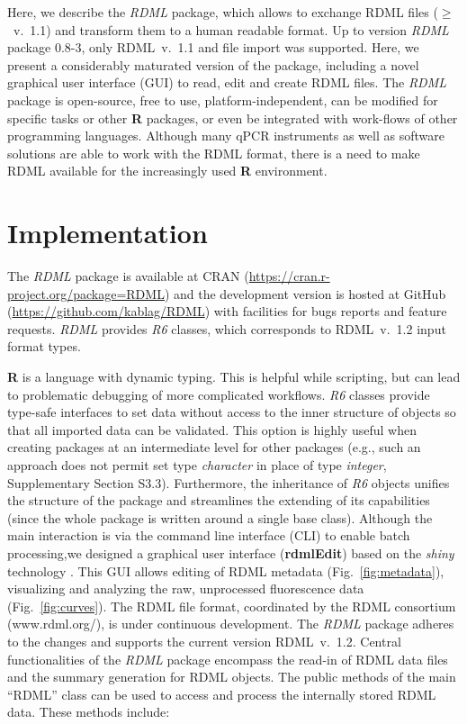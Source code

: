 \documentclass{bioinfo}
\begin{document}
Here, we describe the \textit{RDML} package, which 
allows to exchange RDML files ($\geq$~v.~1.1) and transform them to a human 
readable format. Up to version \textit{RDML} package 0.8-3, only RDML~v.~1.1 and 
file import was supported. Here, we present a considerably maturated version of 
the package, including a novel graphical user interface (GUI) to read, edit and create RDML files. The \textit{RDML} package is open-source, free to use, 
platform-independent, can be modified for specific tasks or other 
\textbf{R} packages, or even be integrated with work-flows of other programming 
languages. Although many qPCR instruments as well as software solutions are able 
to work with the RDML format, there is a need to make RDML available for the increasingly 
used \textbf{R} environment.

\section{Implementation}
The \textit{RDML} package is available at CRAN 
(\url{https://cran.r-project.org/package=RDML}) and the 
development version is hosted at GitHub (\url{https://github.com/kablag/RDML}) 
with facilities for bugs reports and feature requests. \textit{RDML} provides 
\emph{R6} classes, which corresponds to RDML~v.~1.2 input format types. 

\textbf{R} 
is a language with dynamic typing. This is helpful while scripting, but can lead 
to problematic debugging of more complicated workflows. \emph{R6} classes 
provide type-safe interfaces to set data without access to the inner structure of 
objects so that all imported data can be validated. This option is highly useful when 
creating packages at an intermediate level for other packages (e.g., such an
approach does not permit set type \emph{character} in place of type \emph{integer}, 
Supplementary Section S3.3). Furthermore, the inheritance of \emph{R6} objects 
unifies the structure of the package and streamlines the extending of its capabilities 
(since the whole package is written around a single base class). Although the main interaction 
is via the command line interface (CLI) to enable batch processing,we designed a graphical user
interface (\textbf{rdmlEdit}) based on the \textit{shiny} technology \cite{shiny_2016}. This GUI allows editing of RDML metadata (Fig.~\ref{fig:metadata}), visualizing and analyzing the raw, unprocessed fluorescence data (Fig.~\ref{fig:curves}). The RDML file format, coordinated by the RDML consortium (www.rdml.org/), is under continuous development. The \textit{RDML} 
package adheres to the changes and supports the current version RDML~v.~1.2. 
Central functionalities of the \textit{RDML} package encompass the read-in of RDML 
data files and the summary generation for RDML objects. The public methods of the main “RDML” class can be used 
to access and process the internally stored RDML data. These methods include:
\end{document}
